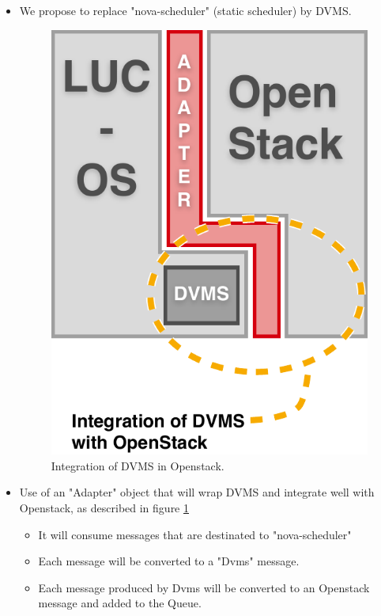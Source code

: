 \begin{itemize}

\item We propose to replace "nova-scheduler" (static scheduler) by DVMS.

\begin{figure}[h]
	\centering
	\includegraphics[width=0.50\linewidth]{Figures/dvms_openstack.pdf}
	\caption{Integration of DVMS in Openstack.}%
	\label{fig:integration}%
\end{figure}

\item Use of an "Adapter" object that will wrap DVMS and integrate well with Openstack, as described in figure \ref{fig:integration}
	\begin{itemize}
		\item It will consume messages that are destinated to "nova-scheduler"

		\item Each message will be converted to a "Dvms" message.

		\item Each message produced by Dvms will be converted to an Openstack message and added to the Queue.

	\end{itemize}



\end{itemize}